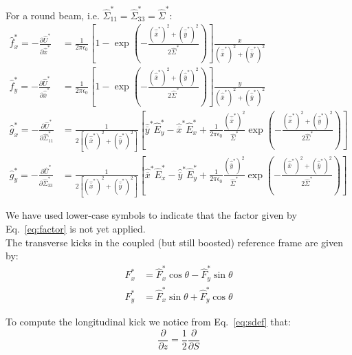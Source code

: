  
For a round beam, i.e. $\hat{\Sigma}^*_{11}=\hat{\Sigma}^*_{33} = \hat{\Sigma}^*$:
\begin{align}
\hat{f}^*_x = -\frac{\partial \hat{U}^*}{\partial \hat{\overline{x}}^*} &= \frac{1}{2 \pi \epsilon_0} \left[1-  \exp \left(-\frac{(\hat{\overline{x}}^*)^2+(\hat{\overline{y}}^*)^2}{2{\hat{\Sigma}}^*}\right) \right]\frac{x}{(\hat{\overline{x}}^*)^2+(\hat{\overline{y}}^*)^2}\\
\hat{f}^*_y = -\frac{\partial \hat{U}^*}{\partial \hat{\overline{x}}^*} &= \frac{1}{2 \pi \epsilon_0} \left[1-  \exp \left(-\frac{(\hat{\overline{x}}^*)^2+(\hat{\overline{y}}^*)^2}{2{\hat{\Sigma}}^*}\right) \right]\frac{y}{(\hat{\overline{x}}^*)^2+(\hat{\overline{y}}^*)^2}\\
\hat{g}^*_x =-\frac{\partial \hat{U}^*}{\partial \hat{\Sigma}^*_{11}} &= \frac{1}{2\left[(\hat{\overline{x}}^*)^2+(\hat{\overline{y}}^*)^2\right]} 
\left[
\hat{\overline{y}}^* \hat{E}^*_y  - \hat{\overline{x}}^* \hat{E}^*_x 
+\frac{1}{ 2 \pi \epsilon_0} \frac{\left(\hat{\overline{x}}^*\right)^2}{\hat{\Sigma}^*} \exp \left(-\frac{(\hat{\overline{x}}^*)^2+(\hat{\overline{y}}^*)^2}{2{\hat{\Sigma}}^*}\right)\right]\\
%
\hat{g}^*_y =-\frac{\partial \hat{U}^*}{\partial \hat{\Sigma}^*_{33}} &= \frac{1}{2\left[(\hat{\overline{x}}^*)^2+(\hat{\overline{y}}^*)^2\right]} 
\left[
\hat{\overline{x}}^* \hat{E}^*_x  - \hat{\overline{y}}^* \hat{E}^*_y 
+\frac{1}{ 2 \pi \epsilon_0} \frac{\left(\hat{\overline{y}}^*\right)^2}{\hat{\Sigma}^*} \exp \left(-\frac{(\hat{\overline{x}}^*)^2+(\hat{\overline{y}}^*)^2}{2{\hat{\Sigma}}^*}\right)\right]
\end{align}

We have used lower-case symbols to indicate that the factor given by Eq.~\ref{eq:factor} is not yet applied.
~\\

The transverse kicks in the coupled (but still boosted) reference frame are given by:
\begin{align}
F^*_x &= \hat{F}^*_x  \cos \theta  -  \hat{F}^*_y \sin \theta \\
F^*_y &= \hat{F}^*_x \sin \theta   + \hat{F}^*_y \cos \theta  
\end{align}

To compute the longitudinal kick we notice from Eq.~\ref{eq:sdef} that:
\begin{equation}
 \frac{\partial }{\partial z} =  \frac{1}{2} \frac{\partial }{\partial S} 
\end{equation}

